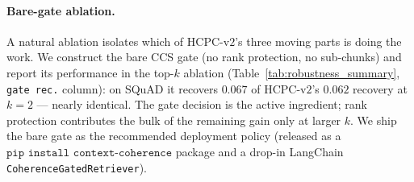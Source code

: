 \paragraph{Bare-gate ablation.}
A natural ablation isolates which of HCPC-v$2$'s three moving parts
is doing the work. We construct the bare CCS gate (no rank
protection, no sub-chunks) and report its performance in the top-$k$
ablation (Table~\ref{tab:robustness_summary}, \texttt{gate~rec.} column):
on SQuAD it recovers $0.067$ of HCPC-v$2$'s $0.062$ recovery at $k=2$
--- nearly identical. The gate decision is the active ingredient;
rank protection contributes the bulk of the remaining gain only at
larger $k$. We ship the bare gate as the recommended deployment
policy (released as a $\texttt{pip install context-coherence}$
package and a drop-in LangChain \texttt{CoherenceGatedRetriever}).
